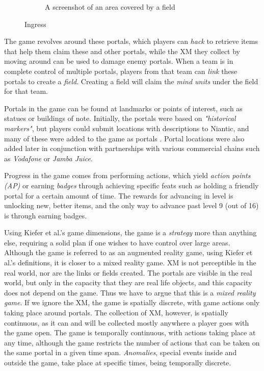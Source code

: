 \begin{figure}[h]
\begin{subfigure}[t]{0.3\textwidth}
		\caption{A screenshot of an area covered by a field}
	\end{subfigure}
	\caption{Ingress}
\end{figure}

The game revolves around these portals, which players can \emph{hack} to retrieve items that help them claim these and other portals, while the XM they collect by moving around can be used to damage enemy portals. When a team is in complete control of multiple portals, players from that team can \emph{link} these portals to create a \emph{field}. Creating a field will claim the \emph{mind units} under the field for that team.

Portals in the game can be found at landmarks or points of interest, such as statues or buildings of note. Initially, the portals were based on \emph{"historical markers"}, but players could submit locations with descriptions to Niantic, and many of these were added to the game as portals \cite{mashableHanke}. Portal locations were also added later in conjunction with partnerships with various commercial chains such as \emph{Vodafone} \cite{auroraPromotion} or \emph{Jamba Juice}.

Progress in the game comes from performing actions, which yield \emph{action points (AP)} or earning \emph{badges} through achieving specific feats such as holding a friendly portal for a certain amount of time. The rewards for advancing in level is unlocking new, better items, and the only way to advance past level 9 (out of 16) is through earning badges.

Using Kiefer et al.'s \cite{kiefer2006systematically} game dimensions, the game is a \emph{strategy} more than anything else, requiring a solid plan if one wishes to have control over large areas. Although the game is referred to as an augmented reality game, using Kiefer et al.'s definitions, it is closer to a mixed reality game. XM is not perceptible in the real world, nor are the links or fields created. The portals are visible in the real world, but only in the capacity that they are real life objects, and this capacity does not depend on the game. Thus we have to argue that this is a \emph{mixed reality game}. If we ignore the XM, the game is spatially discrete, with game actions only taking place around portals. The collection of XM, however, is spatially continuous, as it can and will be collected mostly anywhere a player goes with the game open. The game is temporally continuous, with actions taking place at any time, although the game restricts the number of actions that can be taken on the same portal in a given time span. \emph{Anomalies}, special events inside and outside the game, take place at specific times, being temporally discrete.

